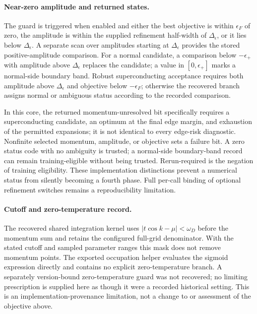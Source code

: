 \paragraph{Near-zero amplitude and returned states.}
The guard is triggered when enabled and either the best objective is within $\epsilon_F$ of zero, the amplitude is within the supplied refinement half-width of $\Delta_\epsilon$, or it lies below $\Delta_\epsilon$. A separate scan over amplitudes starting at $\Delta_\epsilon$ provides the stored positive-amplitude comparison. For a normal candidate, a comparison below $-\epsilon_+$ with amplitude above $\Delta_\epsilon$ replaces the candidate; a value in $[0,\epsilon_+]$ marks a normal-side boundary band. Robust superconducting acceptance requires both amplitude above $\Delta_\epsilon$ and objective below $-\epsilon_F$; otherwise the recovered branch assigns normal or ambiguous status according to the recorded comparison.

In this core, the returned momentum-unresolved bit specifically requires a superconducting candidate, an optimum at the final edge margin, and exhaustion of the permitted expansions; it is not identical to every edge-risk diagnostic. Nonfinite selected momentum, amplitude, or objective sets a failure bit. A zero status code with no ambiguity is trusted; a normal-side boundary-band record can remain training-eligible without being trusted. Rerun-required is the negation of training eligibility. These implementation distinctions prevent a numerical status from silently becoming a fourth phase. Full per-call binding of optional refinement switches remains a reproducibility limitation.

\paragraph{Cutoff and zero-temperature record.}
The recovered shared integration kernel uses $|t\cos k-\mu|<\omega_D$ before the momentum sum and retains the configured full-grid denominator. With the stated cutoff and sampled parameter ranges this mask does not remove momentum points. The exported occupation helper evaluates the sigmoid expression directly and contains no explicit zero-temperature branch. A separately version-bound zero-temperature guard was not recovered; no limiting prescription is supplied here as though it were a recorded historical setting. This is an implementation-provenance limitation, not a change to or assessment of the objective above.

